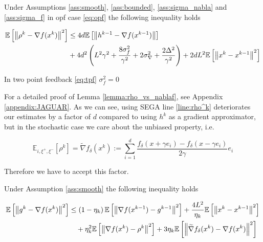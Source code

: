         \begin{lemma}
        \label{lemma:rho_vs_nablaf}
            Under Assumptions \ref{ass:smooth}, \ref{ass:bounded}, \ref{ass:sigma_nabla} and \ref{ass:sigma_f} in opf case \eqref{eq:opf} the following inequality holds
            
            \begin{equation*}
            \begin{split}
                \mathbb{E}\left[ \left\| \rho^k - \nabla f(x^k) \right\|^2 \right]
                &\leq
                4d \mathbb{E}\left[ \left\| h^{k-1} - \nabla f(x^{k-1}) \right\| \right] 
                \\&+ 4d^2 \left( L^2 \gamma^2 
                + \frac{8 \sigma_f^2}{\gamma^2} 
                + 2 \sigma_{\nabla}^2 + \frac{2 \Delta^2}{\gamma^2} \right)
                + 2d L^2 \mathbb{E}\left[ \left\| x^k - x^{k-1} \right\|^2 \right]
            \end{split}
            \end{equation*}
        
            In two point feedback \eqref{eq:tpf} $\sigma^2_f = 0$
        \end{lemma}
    
        For a detailed proof of Lemma \ref{lemma:rho_vs_nablaf}, see Appendix \ref{appendix:JAGUAR}. As we can see, using SEGA line \ref{line:rho^k} deteriorates our estimates by a factor of $d$ compared to using $h^k$ as a gradient approximator, but in the stochastic case we care about the unbiased property, i.e. 
        
        $$\mathbb{E}_{i, \xi^+, \xi^-}[\rho^k] = \widetilde{\nabla} f_\delta(x^k) := \sum\limits_{i = 1}^{d} \frac{f_\delta (x + \gamma e_i) - f_\delta(x - \gamma e_i)}{2 \gamma} e_i$$
        
        Therefore we have to accept this factor.
        
    
        \begin{lemma}
        \label{lemma:g_vs_nabla_f}
            Under Assumption \ref{ass:smooth} the following inequality holds
    
            \begin{equation*}
            \begin{split}
                \mathbb{E}\left[ \left\| g^k - \nabla f(x^k) \right\|^2 \right]
                &\leq 
                \left(1 - \eta_k\right) \mathbb{E}\left[ \left\| \nabla f(x^{k-1}) - g^{k-1} \right\|^2 \right]
                +
                \frac{4 L^2}{\eta_k} \mathbb{E}\left[ \left\| x^k - x^{k-1} \right\|^2 \right]
                \\&\quad+
                \eta_k^2 \mathbb{E}\left[ \left\| \nabla f(x^k) - \rho^k \right\|^2 \right]
                +
                3 \eta_k \mathbb{E}\left[ \left\| \widetilde{\nabla} f_\delta(x^k) - \nabla f(x^k) \right\|^2 \right]
            \end{split}
            \end{equation*}
        \end{lemma}
    
